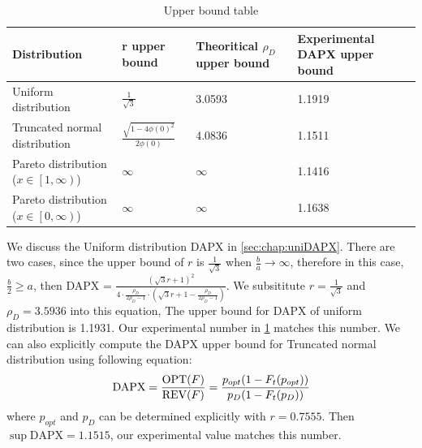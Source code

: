 \begin{center}
	\begin{table}[hbt]
		\begin{tabular}{ | m{3.2cm} | m{2.8cm}| m{3cm} |m{4cm}|  } 
		\hline
		\textbf{Distribution}	&	\textbf{r upper bound}  & \textbf{Theoritical $\rho_D$ upper bound} & 	\textbf{Experimental DAPX upper bound}  \\ 
		\hline
		Uniform distribution&$\frac{1}{\sqrt{3}}$& 3.0593 & 1.1919 \\ 
		\hline
		Truncated normal distribution & $\frac{ \sqrt{1-4\phi(0)^2}}{2\phi(0)}$ & 4.0836& 1.1511 \\ 
		\hline
		 Pareto distribution ($x \in \left[1,\infty \right)$)& $\infty$ & $\infty$& 1.1416 \\
		\hline
		 Pareto distribution ($x \in \left[0,\infty \right)$)& $\infty$ & $\infty$& 1.1638 \\
		\hline
		\end{tabular}
		\caption{Upper bound table}
		\label{tab:dapxbound}
	\end{table}
\end{center}
We discuss the Uniform distribution DAPX in \cref{sec:chap:uniDAPX}. There are two cases, since the upper bound of $r$ is $\frac{1}{\sqrt{3}}$ when $\frac{b}{a} \rightarrow \infty$, therefore in this case, $\frac{b}{2} \geqslant a$, then DAPX =  $\frac{ ( \sqrt{3}r +1)^{2}}{4 \cdot \frac{ \rho_{D}}{2\rho_{D}-1}\cdot( \sqrt{3}r+ 1-\frac{\rho_{D}}{2\rho_{D}-1})}$. We subsititute $r = \frac{1}{\sqrt{3}}$ and $\rho_D = 3.5936$ into this equation, The upper bound for DAPX of uniform distribution is 1.1931. Our experimental number in \cref{tab:dapxbound} matches this number. We can also explicitly compute the DAPX upper bound for Truncated normal distribution using following equation:
\begin{equation}\notag
\text{DAPX} = \frac{\text{OPT}(F)}{\text{REV}(F)} =\frac{p_{opt}(1-F_t(p_{opt}))} {p_D(1-F_t(p_{D}))} 	
\end{equation} 
where $p_{opt}$ and $p_D$ can be determined explicitly with $r = 0.7555$. Then $\sup \text{DAPX} = 1.1515$, our experimental value matches this number. 


